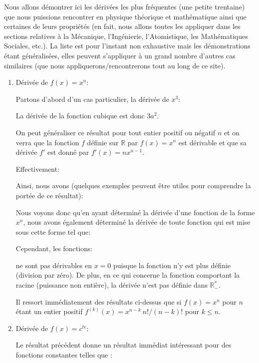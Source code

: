 	 Nous allons démontrer ici les dérivées les plus fréquentes (une petite trentaine) que nous puissions rencontrer en physique théorique et mathématique ainsi que certaines de leurs propriétés (en fait, nous allons toutes les appliquer dans les sections relatives à la Mécanique, l'Ingénierie, l'Atomistique, les Mathématiques Sociales, etc.). La liste est pour l'instant non exhaustive mais les démonstrations étant généralisées, elles peuvent s'appliquer à un grand nombre d'autres cas similaires (que nous appliquerons/rencontrerons tout au long de ce site).
	 \begin{enumerate}
	 	\item Dérivée de $f(x)=x^n$:
	 	
	 	Partons d'abord d'un cas particulier, la dérivée de $x^3$:
	 	
		La dérivée de la fonction cubique est donc $3a^2$.
		
		On peut généraliser ce résultat pour tout entier positif ou négatif $n$ et on verra que la fonction $f$ définie sur $\mathbb{R}$ par $f(x)=x^n$ est dérivable et que sa dérivée $f'$ est donné par $f'(x)=nx^{n-1}$.
		
		Effectivement:
		 
		 Ainsi, nous avons (quelques exemples peuvent être utiles pour comprendre la portée de ce résultat):
		 
		 Nous voyons donc qu'en ayant déterminé la dérivée d'une fonction de la forme $x^n$, nous avons également déterminé la dérivée de toute fonction qui est mise sous cette forme tel que:
		 
		 Cependant, les fonctions:
		 
		 ne sont pas dérivables en $x=0$ puisque la fonction n'y est plus définie (division par zéro). De plus, en ce qui concerne la fonction comportant la racine (puissance non entière), la dérivée n'est pas définie dans $\mathbb{R}_{-}^{*}$.
		 
		 \begin{tcolorbox}[title=Remarque,colframe=black,arc=10pt]
		Il ressort immédiatement des résultats ci-dessus que si $f(x)=x^n$ pour $n$ étant un entier positif $f^{(k)}(x) = x^{n-k}\ n!/(n-k)!$ pour $k\leq n$.
		\end{tcolorbox}	
		 
		 \item Dérivée de $f(x)=c^{te}$:
		 
		 Le résultat précédent donne un résultat immédiat intéressant pour des fonctions constantes telles que :
		 

\end{enumerate}
